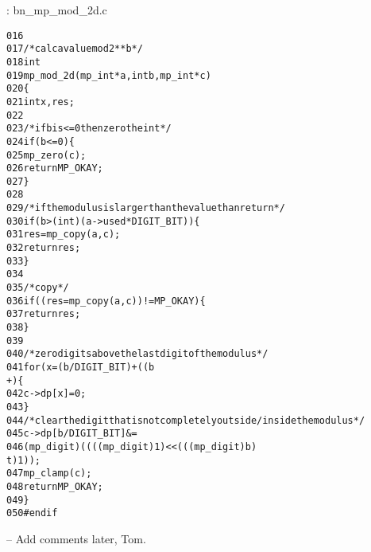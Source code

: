 \documentclass[b5paper]{book}
\begin{document}
\vspace{+3mm}\begin{small}
\hspace{-5.1mm}{\bf File}: bn\_mp\_mod\_2d.c
\vspace{-3mm}
\begin{alltt}
016   
017   /* calc a value mod 2**b */
018   int
019   mp_mod_2d (mp_int * a, int b, mp_int * c)
020   \{
021     int     x, res;
022   
023     /* if b is <= 0 then zero the int */
024     if (b <= 0) \{
025       mp_zero (c);
026       return MP_OKAY;
027     \}
028   
029     /* if the modulus is larger than the value than return */
030     if (b > (int) (a->used * DIGIT_BIT)) \{
031       res = mp_copy (a, c);
032       return res;
033     \}
034   
035     /* copy */
036     if ((res = mp_copy (a, c)) != MP_OKAY) \{
037       return res;
038     \}
039   
040     /* zero digits above the last digit of the modulus */
041     for (x = (b / DIGIT_BIT) + ((b % DIGIT_BIT) == 0 ? 0 : 1); x < c->used; x+
      +) \{
042       c->dp[x] = 0;
043     \}
044     /* clear the digit that is not completely outside/inside the modulus */
045     c->dp[b / DIGIT_BIT] &=
046       (mp_digit) ((((mp_digit) 1) << (((mp_digit) b) % DIGIT_BIT)) - ((mp_digi
      t) 1));
047     mp_clamp (c);
048     return MP_OKAY;
049   \}
050   #endif
\end{alltt}
\end{small}

-- Add comments later, Tom.
\end{document}
